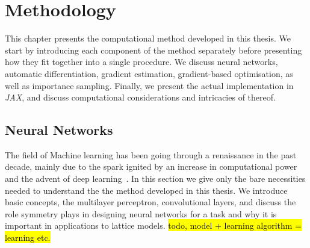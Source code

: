 \ifpdf
\graphicspath{{Chapter4/Figs/Raster/}{Chapter4/Figs/PDF/}{Chapter4/Figs/}}
\else
\graphicspath{{Chapter4/Figs/Vector/}{Chapter4/Figs/}}
\fi



\chapter{Methodology}
\label{chapter4}
This chapter presents the computational method developed in this thesis. We start by introducing each component of the method separately before presenting how they fit together into a single procedure. We discuss neural networks, automatic differentiation, gradient estimation, gradient-based optimisation, as well as importance sampling. Finally, we present the actual implementation in \emph{JAX}, and discuss computational considerations and intricacies of thereof.

\section{Neural Networks} %
The field of Machine learning has been going through a renaissance in the past decade, mainly due to the spark ignited by an increase in computational power and the advent of deep learning~\cite{goodfellow2016deep}. In this section we give only the bare necessities needed to understand the the method developed in this thesis. We introduce basic concepts, the multilayer perceptron, convolutional layers, and discuss the role symmetry plays in designing neural networks for a task and why it is important in applications to lattice models.  
\hl{todo, model + learning algorithm = learning etc.}

\newpage
